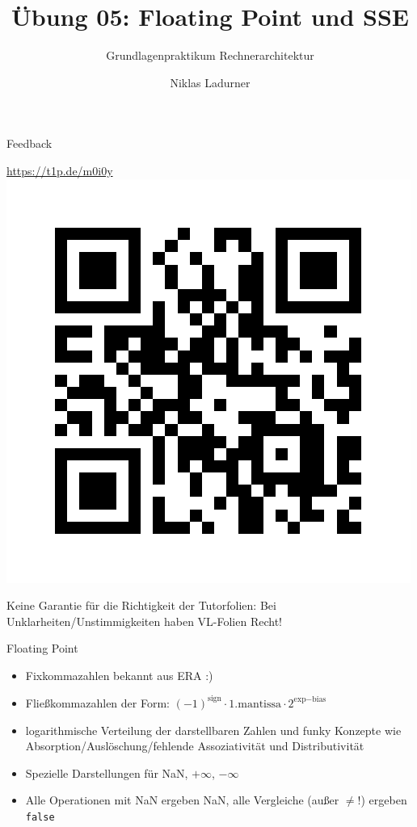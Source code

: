 \documentclass[
  german,            %
  aspectratio=169,    %
]{tumbeamer}
\title{Übung 05: Floating Point und SSE}
\subtitle{Grundlagenpraktikum Rechnerarchitektur}
\author{Niklas Ladurner}
\institute{\theChairName\\\theDepartmentName\\\theUniversityName}
\date{\DTMdisplaydate{2024}{5}{17}{-1}}
\begin{document}
\maketitle

\begin{frame}[c]{Feedback}{}
  \begin{center}
    \LARGE  \href{https://t1p.de/m0i0y}{https://t1p.de/m0i0y}\\
    \includegraphics[height=0.5\textheight]{feedback_qr.png}
  \end{center}
\end{frame}


\begin{frame}[c]{}{}
  \begin{center}
    \LARGE  Keine Garantie für die Richtigkeit der Tutorfolien: Bei Unklarheiten/Unstimmigkeiten
    haben VL-Folien Recht!
  \end{center}
\end{frame}

\begin{frame}[c, fragile]{Floating Point}{}
  \begin{itemize}
    \item Fixkommazahlen bekannt aus ERA :)
    \item Fließkommazahlen der Form: $(-1)^\text{sign}\cdot 1.\text{mantissa}\cdot 2^{\text{exp}-\text{bias}}$
    \item logarithmische Verteilung der darstellbaren Zahlen und funky Konzepte wie Absorption/Auslöschung/fehlende Assoziativität und Distributivität
    \item Spezielle Darstellungen für NaN, $+\infty$, $-\infty$
    \item Alle Operationen mit NaN ergeben NaN, alle Vergleiche (außer $\ne$!) ergeben \verb|false|
  \end{itemize}
\end{frame}
\end{document}
